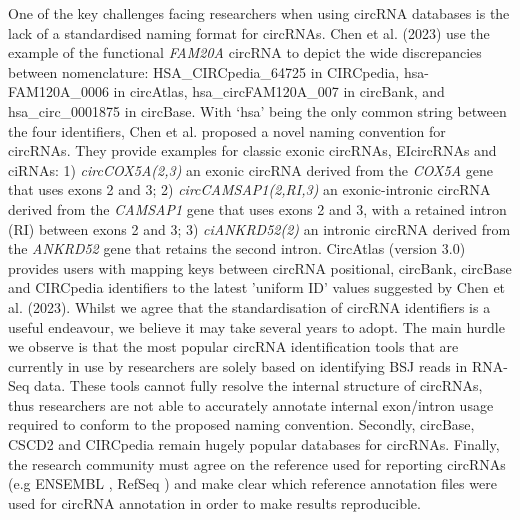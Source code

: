 One of the key challenges facing researchers when using circRNA databases is the lack of a standardised naming format for circRNAs. Chen et al. (2023) \cite{Chen2023Jan} use the example of the functional \textit{FAM20A} circRNA to depict the wide discrepancies between nomenclature: HSA\_CIRCpedia\_64725 in CIRCpedia, hsa-FAM120A\_0006 in circAtlas, hsa\_circFAM120A\_007 in circBank, and hsa\_circ\_0001875 in circBase. With `hsa' being the only common string between the four identifiers, Chen et al. proposed a novel naming convention for circRNAs. They provide examples for classic exonic circRNAs, EIcircRNAs and ciRNAs: 1) \textit{circCOX5A(2,3)} an exonic circRNA derived from the \textit{COX5A} gene that uses exons 2 and 3; 2) \textit{circCAMSAP1(2,RI,3)} an exonic-intronic circRNA derived from the \textit{CAMSAP1} gene that uses exons 2 and 3, with a retained intron (RI) between exons 2 and 3; 3) \textit{ciANKRD52(2)} an intronic circRNA derived from the \textit{ANKRD52} gene that retains the second intron. CircAtlas (version 3.0) \cite{circatlas3} provides users with mapping keys between circRNA positional, circBank, circBase and CIRCpedia identifiers to the latest 'uniform ID' values suggested by Chen et al. (2023). Whilst we agree that the standardisation of circRNA identifiers is a useful endeavour, we believe it may take several years to adopt. The main hurdle we observe is that the most popular circRNA identification tools that are currently in use by researchers are solely based on identifying BSJ reads in RNA-Seq data. These tools cannot fully resolve the internal structure of circRNAs, thus researchers are not able to accurately annotate internal exon/intron usage required to conform to the proposed naming convention. Secondly, circBase, CSCD2 and CIRCpedia remain hugely popular databases for circRNAs. Finally, the research community must agree on the reference used for reporting circRNAs (e.g ENSEMBL \cite{ENSEMBL2023}, RefSeq \cite{RefSeq}) and make clear which reference annotation files were used for circRNA annotation in order to make results reproducible.



